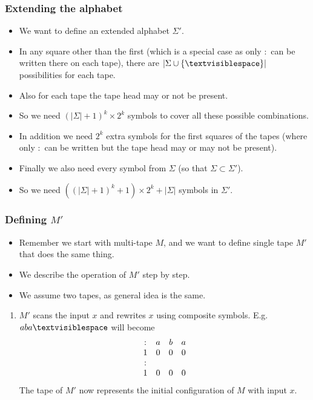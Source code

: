 \documentclass[handout]{beamer}
\newcommand{\tvs}{\textvisiblespace}
\begin{document}
\begin{frame}
\frametitle{Extending the alphabet}
\begin{itemize}
\item We want to define an extended alphabet $\Sigma'$.
\vspace{0.1cm}
\item In any square other than the first (which is a special case as only $:$ can be written there on each tape), there are $|\Sigma\cup\{\tvs\}|$ possibilities for each tape.
\vspace{0.1cm}
\item Also for each tape the tape head may or not be present. 
\vspace{0.1cm}
\item So we need $(|\Sigma|+1)^k\times 2^k$ symbols to cover all these possible combinations. 
\vspace{0.1cm}
\item In addition we need $2^k$ extra symbols for the first squares of the tapes (where only $:$ can be written but the tape head may or may not be present). 
\vspace{0.1cm}
\item Finally we also need every symbol from $\Sigma$ (so that $\Sigma\subset \Sigma'$). 
\vspace{0.1cm}
\item So we need $((|\Sigma|+1)^k+1)\times 2^k+|\Sigma|$ symbols in $\Sigma'$.
\end{itemize}

\end{frame}

\begin{frame}
\frametitle{Defining $M'$}
\begin{itemize}
\item Remember we start with multi-tape $M$, and we want to define single tape $M'$ that does the same thing.
\vspace{0.1cm}
\item We describe the operation of $M'$ step by step.
\vspace{0.1cm}
\item We assume two tapes, as general idea is the same.
\end{itemize}
\begin{enumerate}
\item $M'$ scans the input $x$ and rewrites $x$ using composite symbols. E.g. $aba\tvs$ will become 
\[ \begin{array}{cccc}
: & a & b & a  \\
1 & 0 & 0 & 0 \\
: & \tvs & \tvs & \tvs  \\
1 & 0 & 0 & 0  
\end{array} \] 
The tape of  $M'$ now represents the initial configuration of $M$ with input $x$. 
\end{enumerate} 
\end{frame}
\end{document}
